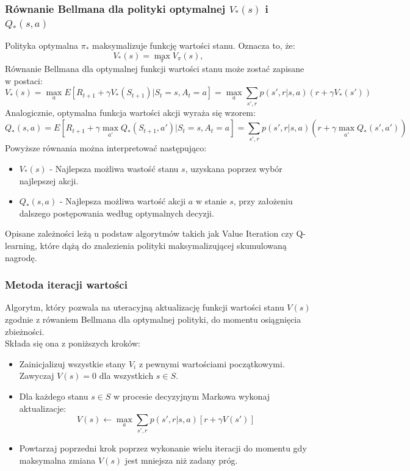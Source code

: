 \documentclass[a4paper, 12pt]{article}
\begin{document}
    \subsubsection{Równanie Bellmana dla polityki optymalnej \( V_*(s) \) i \( Q_*(s,a) \)}
    Polityka optymalna \( \pi_* \) maksymalizuje funkcję wartości stanu. Oznacza to, że:
    \[ V_*(s) = \max_{\pi} V_{\pi}(s), \]
    Równanie Bellmana dla optymalnej funkcji wartości stanu może zostać zapisane w postaci:
    \[ V_*(s) = \max_{a} E[R_{t+1} + \gamma V_*(S_{t+1})|S_t = s, A_t = a] = 
    \max_{a} \sum_{s',r} p(s',r|s,a)(r + \gamma V_*(s'))\]
    Analogicznie, optymalna funkcja wartości akcji wyraża się wzorem:
    \[ Q_*(s,a) = E[R_{t+1} + \gamma \max_{a'} Q_*(S_{t+1},a')|S_t = s, A_t = a] =
    \sum_{s',r} p(s',r|s,a)(r + \gamma \max_{a'} Q_*(s',a')) \]
    Powyższe równania można interpretować następująco:
    \begin{itemize}
        \item \( V_*(s) \) - Najlepsza możliwa wastość stanu \( s \), uzyskana poprzez wybór najlepszej akcji.
        \item \( Q_*(s,a) \) - Najlepsza możliwa wartość akcji \( a \) w stanie \( s \), przy założeniu dalszego postępowania według optymalnych decyzji.
    \end{itemize}
    Opisane zależności leżą u podstaw algorytmów takich jak Value Iteration czy Q-learning, które dążą do znalezienia polityki maksymalizującej skumulowaną nagrodę.
    \subsubsection{Metoda iteracji wartości}
    Algorytm, który pozwala na uteracyjną aktualizację funkcji wartości stanu \( V(s) \) zgodnie z rówaniem Bellmana dla optymalnej polityki, do momentu osiągnięcia zbieżności.
    \\ Składa się ona z poniższych kroków:
    \begin{itemize}
        \item Zainicjalizuj wszystkie stany \( V_i \) z pewnymi wartościami początkowymi. Zawyczaj \( V(s) = 0 \) dla wszystkich \( s \in S \).
        \item Dla każdego stanu \( s \in S \) w procesie decyzyjnym Markowa wykonaj aktualizacje:
        \[ V(s) \leftarrow \max_a \sum_{s',r} p(s',r|s,a)[r + \gamma V(s')] \]
        \item Powtarzaj poprzedni krok poprzez wykonanie wielu iteracji do momentu gdy maksymalna zmiana \( V(s) \) jest mniejsza niż zadany próg. 
    \end{itemize}
\end{document}
